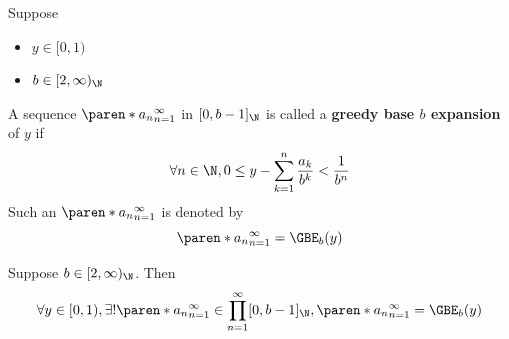 \bigskip

\begin{definition} \label{an:def:greedy-base-expansion}
  Suppose
  \begin{itemize}
    \item $y \in [0, 1)$
    \item $b \in [2, \infty)_{\N}$
  \end{itemize}
  A sequence $\paren*{a_{n}}_{n = 1}^{\infty}$ in $[0, b - 1]_{\N}$ is called a \textbf{greedy base $b$ expansion} of $y$ if
  \[
    \forall n \in \N, 0 \leq y - \sum_{k = 1}^{n} \frac{a_{k}}{b^{k}} < \frac{1}{b^{n}}
  \]
  Such an $\paren*{a_{n}}_{n = 1}^{\infty}$ is denoted by
  \[
    \paren*{a_{n}}_{n = 1}^{\infty} = \GBE_{b}(y)
  \]
\end{definition}

\bigskip

\begin{theorem} \label{an:thm:existence-and-uniqueness-of-greedy-base-expansion}
  Suppose $b \in [2, \infty)_{\N}$. Then
  \[
    \forall y \in [0, 1), \exists! \paren*{a_{n}}_{n = 1}^{\infty} \in \prod_{n = 1}^{\infty} [0, b - 1]_{\N},
    \paren*{a_{n}}_{n = 1}^{\infty} = \GBE_{b}(y)
  \]
\end{theorem}
